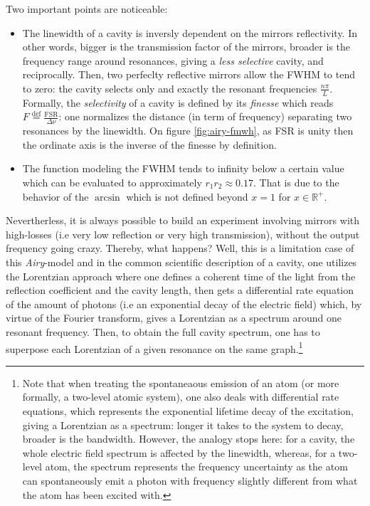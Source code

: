 \documentclass[10pt]{report}
\begin{document}
Two important points are noticeable:
\begin{itemize}
	\item The linewidth of a cavity is inversly dependent on the mirrors reflectivity. In other words, bigger is the transmission factor of the mirrors, broader is the frequency range around resonances, giving a \textit{less selective} cavity, and reciprocally. Then, two perfeclty reflective mirrors allow the FWHM to tend to zero: the cavity selects only and exactly the resonant frequencies $\frac{n\pi}{L}$. Formally, the \textit{selectivity} of a cavity is defined by its \textit{finesse} which reads $F \stackrel{\text{def}}{=} \frac{\textrm{FSR}}{\Delta\nu}$: one normalizes the distance (in term of frequency) separating two resonances by the linewidth. On figure \ref{fig:airy-fmwh}, as FSR is unity then the ordinate axis is the inverse of the finesse by definition.
	\item The function modeling the FWHM tends to infinity below a certain value which can be evaluated to approximately $r_1r_2 \approx 0.17$. That is due to the behavior of the $\arcsin$ which is not defined beyond $x=1$ for $x \in \mathbb{R}^+$. 
\end{itemize}

Nevertherless, it is always possible to build an experiment involving mirrors with high-losses (i.e very low reflection or very high transmission), without the output frequency going crazy. Thereby, what happens? Well, this is a limitation case of this \textit{Airy}-model and in the common scientific description of a cavity, one utilizes the Lorentzian approach where one defines a coherent time of the light from the reflection coefficient and the cavity length, then gets a differential rate equation of the amount of photons (i.e an exponential decay of the electric field) which, by virtue of the Fourier transform, gives a Lorentzian as a spectrum around one resonant frequency. Then, to obtain the full cavity spectrum, one has to superpose each Lorentzian of a given resonance on the same graph.\footnote{Note that when treating the spontaneaous emission of an atom (or more formally, a two-level atomic system), one also deals with differential rate equations, which represents the exponential lifetime decay of the excitation, giving a Lorentzian as a spectrum: longer it takes to the system to decay, broader is the bandwidth. However, the analogy stops here: for a cavity, the whole electric field spectrum is affected by the linewidth, whereas, for a two-level atom, the spectrum represents the frequency uncertainty as the atom can spontaneously emit a photon with frequency slightly different from what the atom has been excited with.}
\end{document}
